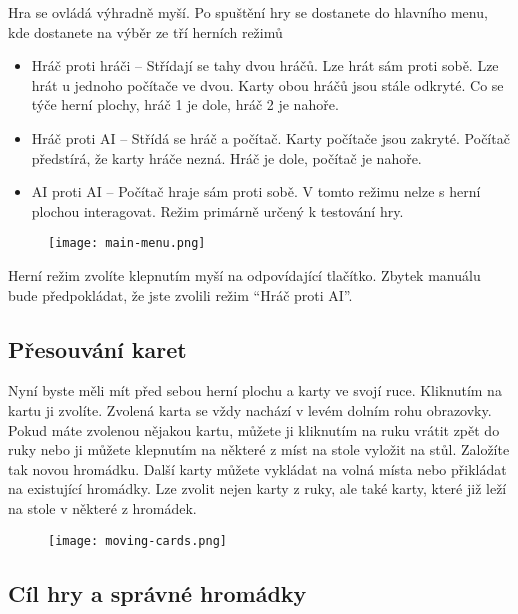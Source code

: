 \documentclass{article}
\begin{document}
Hra se ovládá výhradně myší. Po spuštění hry se dostanete do hlavního menu, kde
dostanete na výběr ze tří herních režimů
\begin{itemize}
	\item Hráč proti hráči -- Střídají se tahy dvou hráčů. Lze hrát sám
		proti sobě. Lze hrát u jednoho počítače ve dvou. Karty obou
		hráčů jsou stále odkryté. Co se týče herní plochy, hráč 1 je
		dole, hráč 2 je nahoře.
	\item Hráč proti AI -- Střídá se hráč a počítač. Karty počítače jsou
		zakryté. Počítač předstírá, že karty hráče nezná. Hráč je dole,
		počítač je nahoře.
	\item AI proti AI -- Počítač hraje sám proti sobě. V tomto režimu nelze
		s herní plochou interagovat. Režim primárně určený k testování
		hry.
\end{itemize}

\begin{figure}[H]
	\begin{center}
		\texttt{[image: main-menu.png]}
	\end{center}
\end{figure}

Herní režim zvolíte klepnutím myší na odpovídající tlačítko. Zbytek manuálu
bude předpokládat, že jste zvolili režim \enquote{Hráč proti AI}.

\subsection*{Přesouvání karet}

Nyní byste měli mít před sebou herní plochu a karty ve svojí ruce. Kliknutím na
kartu ji zvolíte. Zvolená karta se vždy nachází v levém dolním rohu obrazovky.
Pokud máte zvolenou nějakou kartu, můžete ji kliknutím na ruku vrátit zpět do
ruky nebo ji můžete klepnutím na některé z míst na stole vyložit na stůl.
Založíte tak novou hromádku. Další karty můžete vykládat na volná místa nebo
přikládat na existující hromádky. Lze zvolit nejen karty z ruky, ale také
karty, které již leží na stole v některé z hromádek.

\begin{figure}[H]
	\begin{center}
		\texttt{[image: moving-cards.png]}
	\end{center}
\end{figure}

\subsection*{Cíl hry a správné hromádky}
\end{document}
